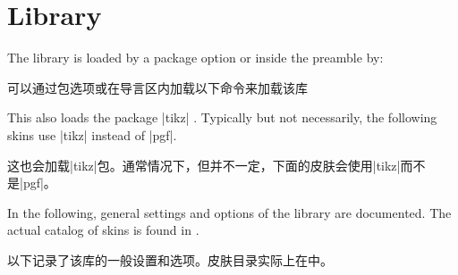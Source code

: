 \section{Library }\label{sec:skins}%
%
The library is loaded by a package option or inside the preamble by:

可以通过包选项或在导言区内加载以下命令来加载该库
\begin{dispListing}
\end{dispListing}
This also loads the package |tikz| \cite{tantau:tikz_and_pgf}. Typically but not necessarily,
the following skins use |tikz| instead of |pgf|.

这也会加载|tikz|包\cite{tantau:tikz_and_pgf}。通常情况下，但并不一定，下面的皮肤会使用|tikz|而不是|pgf|。

In the following, general settings and options of the library are
documented.
The actual catalog of skins is found in .

以下记录了该库的一般设置和选项。皮肤目录实际上在中。

% 
% 







